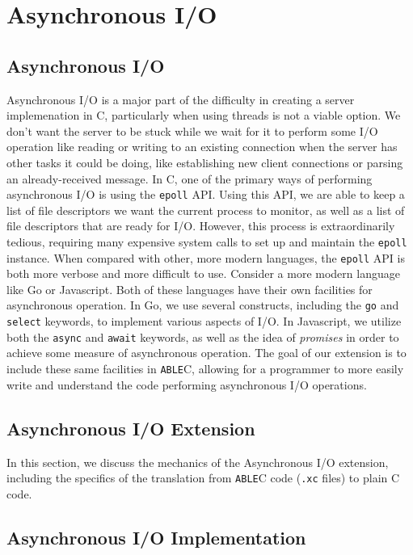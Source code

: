 \documentclass[main.tex]{subfiles}
\begin{document}
\section{Asynchronous I/O}

\subsection{Asynchronous I/O}
Asynchronous I/O is a major part of the difficulty in creating a server
implemenation in C, particularly when using threads is not a viable option. We
don't want the server to be stuck while we wait for it to perform some I/O
operation like reading or writing to an existing connection when the server has
other tasks it could be doing, like establishing new client connections or
parsing an already-received message. In C, one of the primary ways of performing
asynchronous I/O is using the \verb|epoll| API. Using this API, we are able to
keep a list of file descriptors we want the current process to monitor, as well
as a list of file descriptors that are ready for I/O. However, this process is
extraordinarily tedious, requiring many expensive system calls to set up and
maintain the \verb|epoll| instance. When compared with other, more modern
languages, the \verb|epoll| API is both more verbose and more difficult to use.
Consider a more modern language like Go or Javascript. Both of these languages
have their own facilities for asynchronous operation. In Go, we use several
constructs, including the \verb|go| and \verb|select| keywords, to implement
various aspects of I/O. In Javascript, we utilize both the \verb|async| and
\verb|await| keywords, as well as the idea of \emph{promises} in order to
achieve some measure of asynchronous operation. The goal of our extension is to
include these same facilities in \verb|ABLE|C, allowing for a programmer to more
easily write and understand the code performing asynchronous I/O operations.

\subsection{Asynchronous I/O Extension}
In this section, we discuss the mechanics of the Asynchronous I/O extension, including
the specifics of the translation from \verb|ABLE|C code (\verb|.xc| files) to plain C code.

\subsection{Asynchronous I/O Implementation}

\begin{figure}
\end{figure}
\begin{figure}
\end{figure}
\end{document}
